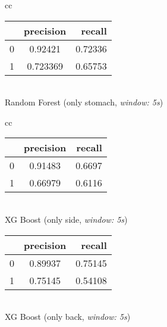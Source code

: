 \begin{table}
\begin{tabular}{cc}
    \begin{minipage}{0.33\textwidth}
        \begin{center}
            \begin{tabular}{ | l | c | r | }
              \hline
               & precision & recall \\ \hline
              0 & 0.92421 & 0.72336 \\ \hline
              1 & 0.723369 & 0.65753 \\
              \hline
            \end{tabular}
            \smallskip
            \\ Random Forest (only stomach, \textit{window: 5s})
        \end{center}
    \end{minipage}
\end{tabular}
\newline
\vspace*{5mm}
\newline
\begin{tabular}{cc}
    \begin{minipage}{0.33\textwidth}
        \begin{center}
            \begin{tabular}{ | l | c | r | }
              \hline
               & precision & recall \\ \hline
              0 & 0.91483 & 0.6697 \\ \hline
              1 & 0.66979 & 0.6116 \\
              \hline
            \end{tabular}
            \smallskip
            \\ XG Boost (only side, \textit{window: 5s})
        \end{center}
    \end{minipage}

    \begin{minipage}{0.33\textwidth}
        \begin{center}
            \begin{tabular}{ | l | c | r | }
              \hline
               & precision & recall \\ \hline
              0 & 0.89937 & 0.75145 \\ \hline
              1 & 0.75145 & 0.54108 \\
              \hline
            \end{tabular}
            \smallskip
            \\ XG Boost (only back, \textit{window: 5s})
        \end{center}
    \end{minipage}


\end{tabular}
\end{table}
